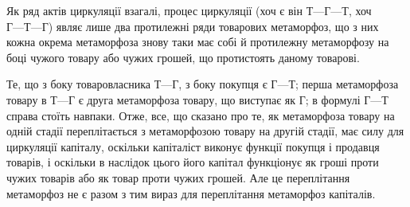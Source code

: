 Як ряд актів циркуляції взагалі, процес циркуляції (хоч є він $Т — Г — Т$,
хоч $Г — Т — Г$) являє лише два протилежні ряди товарових метаморфоз,
що з них кожна окрема метаморфоза знову таки має собі й протилежну
метаморфозу на боці чужого товару або чужих грошей, що протистоять
даному товарові.

Те, що з боку товаровласника $Т — Г$, з боку покупця є $Г — Т$; перша
метаморфоза товару в $Т — Г$ є друга метаморфоза товару, що виступає
як $Г$; в формулі $Г — Т$ справа стоїть навпаки. Отже, все, що сказано
про те, як метаморфоза товару на одній стадії переплітається з метаморфозою
товару на другій стадії, має силу для циркуляції капіталу,
оскільки капіталіст виконує функції покупця і продавця товарів, і
оскільки в наслідок цього його капітал функціонує як гроші проти
чужих товарів або як товар проти чужих грошей. Але це переплітання
метаморфоз не є разом з тим вираз для переплітання метаморфоз капіталів.
